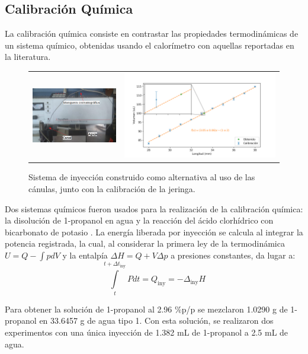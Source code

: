 \documentclass[a0]{sciposter}
\begin{document}
\begin{multicols}{3}
\section{Calibraci\'on Qu\'imica}
	La calibraci\'on qu\'imica consiste en contrastar las propiedades termodin\'amicas de un sistema qu\'imico, obtenidas usando el calor\'imetro con aquellas reportadas en la literatura. 
	\begin{figure}[h]
		\centering
		\begin{tabular}{cc}
			\includegraphics[width=0.4\linewidth]{../Tesis/Figures/sistemaInyeccion} & 
			\includegraphics[width=0.6\linewidth]{../Data/Syringe/syringe_cal.png}
		\end{tabular}
		\caption{Sistema de inyección construido como alternativa al uso de las cánulas, junto con la calibración de la jeringa.}
	\end{figure}

	Dos sistemas qu\'imicos fueron usados para la realizaci\'on de la calibraci\'on qu\'imica: la disoluci\'on de 1-propanol en agua y la reacci\'on del \'acido clorhídrico con bicarbonato de potasio \cite{demarse2011calibration, adao2012chemical, nanoitc}. La energía liberada por inyección se calcula al integrar la potencia registrada, la cual, al considerar la primera ley de la termodinámica $U = Q-\int pdV$ y la entalpía $\Delta H = Q + V\Delta p$ a presiones constantes, da lugar a:
	\begin{equation}
		\int\limits_t^{t+\Delta t_\text{iny}} Pdt = Q_\text{iny} = -\Delta_\text{iny}H
	\end{equation}
	
	Para obtener la soluci\'on de 1-propanol al 2.96 \%p/p se mezclaron 1.0290 g de 1-propanol en 33.6457 g de agua tipo 1. Con esta soluci\'on, se realizaron dos experimentos con una \'unica inyecci\'on de 1.382 mL de 1-propanol a 2.5 mL de agua.
	

\end{multicols}
\end{document}
